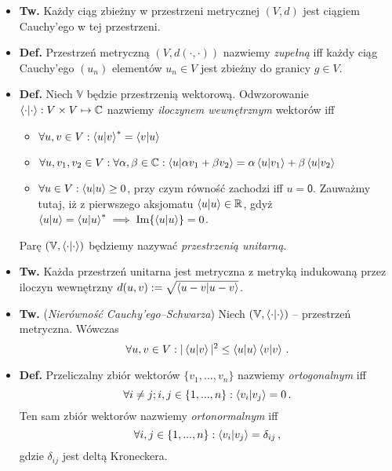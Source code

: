 \documentclass{myclass}
\begin{document}
\begin{itemize}
    \item \textbf{Tw.} Każdy ciąg zbieżny w przestrzeni metrycznej \((V,d)\) jest ciągiem Cauchy'ego
    w tej przestrzeni.

    \item \textbf{Def.} Przestrzeń metryczną \((V,d(\cdot,\cdot))\) nazwiemy \textit{zupełną} iff
    każdy ciąg Cauchy'ego \((u_n)\) elementów \(u_n \in V\) jest zbieżny do granicy \(g \in V\).

    \item \textbf{Def.} Niech \(\mathbb{V}\) będzie przestrzenią wektorową. Odwzorowanie
    \(\braket{\cdot} : V \times V \mapsto \mathbb{C}\) nazwiemy \textit{iloczynem wewnętrznym}
    wektorów iff
    \begin{itemize}
        
        \item \(\forall u,v \in V : \braket{u}{v}^* = \braket{v}{u}\)
        
        \item \(\forall u,v_1,v_2 \in V : \forall \alpha, \beta \in \mathbb{C} : \braket{u}{\alpha
        v_1 + \beta v_2} = \alpha \braket{u}{v_1} + \beta \braket{u}{v_2}\)

        \item \(\forall u \in V : \braket{u} \geq 0\), przy czym równość zachodzi iff \(u =
        \mathsf{0}\). Zauważmy tutaj, iż z pierwszego aksjomatu \(\braket{u} \in \mathbb{R}\), gdyż
        \(\braket{u} = \braket{u}^* \implies \Im{\braket{u}} = 0\).

    \end{itemize}
    
    Parę \((\mathbb{V},\braket{\cdot})\) będziemy nazywać \textit{przestrzenią unitarną}.

    \item \textbf{Tw.} Każda przestrzeń unitarna jest metryczna z metryką indukowaną przez iloczyn
    wewnętrzny \(d(u,v) := \sqrt{\braket{u-v}}\).

    \item \textbf{Tw.} (\textit{Nierówność Cauchy'ego--Schwarza}) Niech
    \((\mathbb{V},\braket{\cdot})\) -- przestrzeń metryczna. Wówczas
    \begin{equation*}
        \forall u,v \in V : |\braket{u}{v}|^2 \leq \braket{u}\braket{v}\,.
    \end{equation*}  

    \item \textbf{Def.} Przeliczalny zbiór wektorów \(\{v_1,...,v_n\}\) nazwiemy
    \textit{ortogonalnym} iff 
    \begin{equation*}
        \forall i\neq j; i,j\in\{1,...,n\} : \braket{v_i}{v_j} = 0\,.
    \end{equation*}
    Ten sam zbiór wektorów nazwiemy \textit{ortonormalnym} iff 
    \begin{equation*}
        \forall i,j\in\{1,...,n\} : \braket{v_i}{v_j} = \delta_{ij}\,,
    \end{equation*}
    gdzie \(\delta_{ij}\) jest deltą Kroneckera.


\end{itemize}
\end{document}
